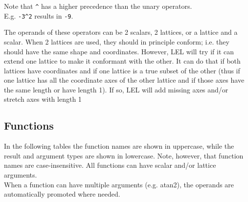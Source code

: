Note that \verb+^+ has a higher precedence than the unary operators.
\\E.g. \texttt{-3}\verb+^+\texttt{2} results in \texttt{-9}.

The operands of these operators can be 2 scalars, 2 lattices, or a
lattice and a scalar. When 2 lattices are used, they should in
principle conform; i.e. they should have the same shape and
coordinates. However, LEL will try if it can extend
one lattice to make it conformant with the other. It can do that
if both lattices have coordinates and if one lattice is a true
subset of the other (thus if one lattice has all the coordinate
axes of the other lattice and if those axes have the same length or
have length 1). If so, LEL will add missing axes and/or
stretch axes with length 1

\subsection{\label{LEL:FUNCTIONS}Functions}
In the following tables the function names are shown in uppercase,
while the result and argument types are shown in lowercase.
Note, however, that function names are case-insensitive.
All functions can have scalar and/or lattice arguments.
\\When a function can have multiple arguments (e.g. atan2), the
operands are automatically promoted where needed.

